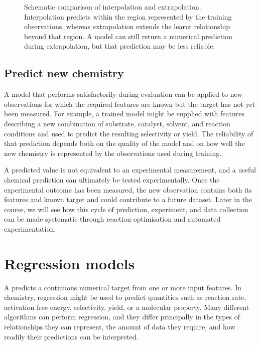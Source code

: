 \begin{figure}[htbp]
{%
  }

  \caption{
    Schematic comparison of interpolation and extrapolation.
    Interpolation predicts within the region represented by the training observations, whereas extrapolation extends the learnt relationship beyond that region.
    A model can still return a numerical prediction during extrapolation, but that prediction may be less reliable.
  }
  \label{fig2-5:interpolation-extrapolation}
\end{figure}

\subsection{Predict new chemistry}

A model that performs satisfactorily during evaluation can be applied to new observations for which the required features are known but the target has not yet been measured.
For example, a trained model might be supplied with features describing a new combination of substrate, catalyst, solvent, and reaction conditions and used to predict the resulting selectivity or yield.
The reliability of that prediction depends both on the quality of the model and on how well the new chemistry is represented by the observations used during training.

A predicted value is not equivalent to an experimental measurement, and a useful chemical prediction can ultimately be tested experimentally.
Once the experimental outcome has been measured, the new observation contains both its features and known target and could contribute to a future dataset.
Later in the course, we will see how this cycle of prediction, experiment, and data collection can be made systematic through reaction optimisation and automated experimentation.

\section{Regression models}

A  predicts a continuous numerical target from one or more input features.
In chemistry, regression might be used to predict quantities such as reaction rate, activation free energy, selectivity, yield, or a molecular property.
Many different algorithms can perform regression, and they differ principally in the types of relationships they can represent, the amount of data they require, and how readily their predictions can be interpreted.

